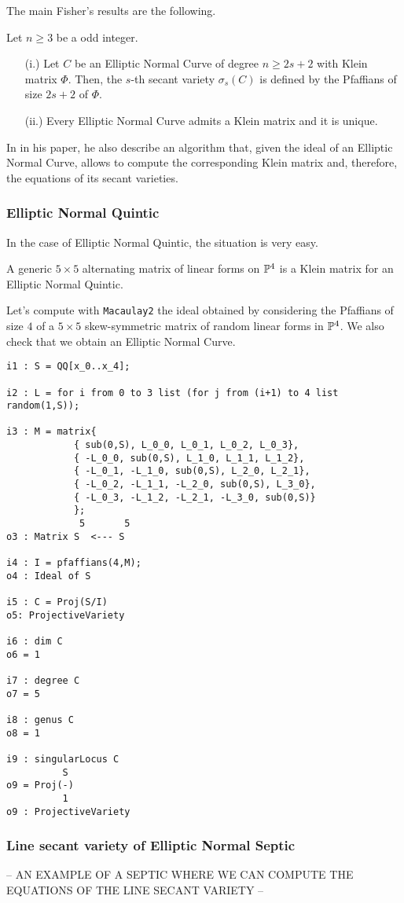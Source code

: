The main Fisher's results are the following.

\begin{theorem}{\rm \cite[Theorem 1.2 and Theorem 1.3]{FisherENC}} Let $n\geq 3$ be a odd integer.
 \begin{itemize}
  \item[{\rm (i.)}] Let $C$ be an Elliptic Normal Curve of degree $n\geq 2s+2$ with Klein matrix $\Phi$. Then, the $s$-th secant variety $\sigma_s(C)$ is defined by the Pfaffians of size $2s+2$ of $\Phi$.
  
  \item[{\rm (ii.)}] Every Elliptic Normal Curve admits a Klein matrix and it is unique.
 \end{itemize}
\end{theorem}

In in his paper, he also describe an algorithm that, given the ideal of an Elliptic Normal Curve, allows to compute the corresponding Klein matrix and, therefore,  the equations of its secant varieties.

\subsubsection{Elliptic Normal Quintic} In the case of Elliptic Normal Quintic, the situation is very easy.

\begin{prop}{\rm \cite[Proposition 1.4]{FisherENC}} A generic $5 \times 5$ alternating matrix of linear forms on $\P^4$ is a Klein matrix for an Elliptic Normal Quintic.
\end{prop}

\noindent Let's compute with \texttt{Macaulay2} the ideal obtained by considering the Pfaffians of size $4$ of a $5 \times 5$ skew-symmetric matrix of random linear forms in $\P^4$. We also check that we obtain an Elliptic Normal Curve.
\begin{verbatim}
i1 : S = QQ[x_0..x_4];

i2 : L = for i from 0 to 3 list (for j from (i+1) to 4 list random(1,S));

i3 : M = matrix{
     		{ sub(0,S), L_0_0, L_0_1, L_0_2, L_0_3},
     		{ -L_0_0, sub(0,S), L_1_0, L_1_1, L_1_2},
     		{ -L_0_1, -L_1_0, sub(0,S), L_2_0, L_2_1},
     		{ -L_0_2, -L_1_1, -L_2_0, sub(0,S), L_3_0},
     		{ -L_0_3, -L_1_2, -L_2_1, -L_3_0, sub(0,S)}
     		};
             5       5
o3 : Matrix S  <--- S

i4 : I = pfaffians(4,M);
o4 : Ideal of S

i5 : C = Proj(S/I)
o5: ProjectiveVariety

i6 : dim C
o6 = 1

i7 : degree C
o7 = 5

i8 : genus C
o8 = 1

i9 : singularLocus C
          S
o9 = Proj(-)
          1
o9 : ProjectiveVariety
\end{verbatim}

\subsubsection{Line secant variety of Elliptic Normal Septic} -- AN EXAMPLE OF A SEPTIC WHERE WE CAN COMPUTE THE EQUATIONS OF THE LINE SECANT VARIETY --
